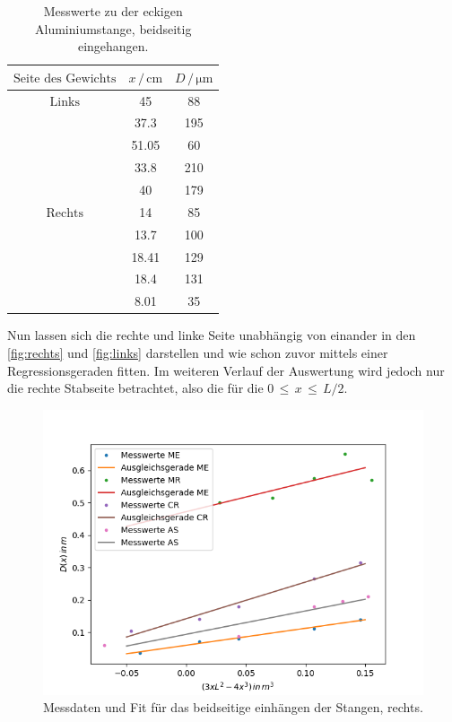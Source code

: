 \begin{table}
	\centering
	\caption{Messwerte zu der eckigen Aluminiumstange, beidseitig eingehangen.} 
	\label{tab:vana} 
	\begin{tabular}{c c c}
	\toprule
	$\text{Seite des Gewichts} $&$x \, / \, \si{\centi\meter}$ & $D \, / \, \si{\micro\meter}$\\
	\midrule
    $\text{Links}$  &45       &   88\\
                    &37.3     &  195\\
                    &51.05    &   60\\
                    &33.8     &  210\\
                    &40       &  179\\
    $\text{Rechts}$ &14       &   85\\
                    &13.7     &  100\\
                    &18.41    &  129\\
                    &18.4     &  131\\
                    &8.01     &   35\\
\bottomrule
	\end{tabular}
\end{table}

\noindent
Nun lassen sich die rechte und linke Seite unabhängig von einander in den \autoref{fig:rechts} und \autoref{fig:links} darstellen und wie schon zuvor mittels einer
Regressionsgeraden fitten. Im weiteren Verlauf der Auswertung wird jedoch nur die rechte Stabseite betrachtet, also die für die $ 0 \, \leq \, x \, \leq \, L/2$. 

\begin{figure}[H]
	\centering
	\includegraphics{Daten/AS2_r.png}
	\caption{Messdaten und Fit für das beidseitige einhängen der Stangen, rechts.}
	\label{fig:rechts}
\end{figure}

